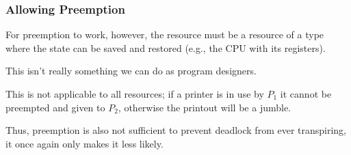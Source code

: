\begin{frame}
\frametitle{Allowing Preemption}

For preemption to work, however, the resource must be a resource of a type where the state can be saved and restored (e.g., the CPU with its registers). 

This isn't really something we can do as program designers.

This is not applicable to all resources; if a printer is in use by $P_{1}$ it cannot be preempted and given to $P_{2}$, otherwise the printout will be a jumble. 

Thus, preemption is also not sufficient to prevent deadlock from ever transpiring, it once again only makes it less likely.



\end{frame}




